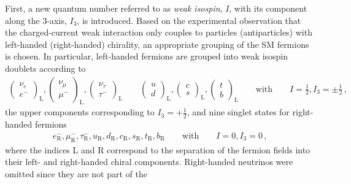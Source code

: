 First, a new quantum number referred to as \emph{weak isospin}, $I$, with its
component along the 3-axis, $I_3$, is introduced. Based on the experimental
observation that the charged-current weak interaction only couples to particles
(antiparticles) with left-handed (right-handed) chirality, an appropriate
grouping of the SM fermions is chosen. In particular, left-handed fermions are
grouped into weak isospin doublets according to
\begin{align*}
  \begin{pmatrix}
    \nu_{e} \\
    e^{-}
  \end{pmatrix}_{\text{L}},
  \begin{pmatrix}
    \nu_{\mu} \\
    \mu^{-}
  \end{pmatrix}_{\text{L}},
  \begin{pmatrix}
    \nu_{\tau} \\
    \tau^{-}
  \end{pmatrix}_{\text{L}}
  \qquad
  \begin{pmatrix}
    u \\
    d
  \end{pmatrix}_{\text{L}},
  \begin{pmatrix}
    c \\
    s
  \end{pmatrix}_{\text{L}},
  \begin{pmatrix}
    t \\
    b
  \end{pmatrix}_{\text{L}}
  \qquad
  \text{with}
  \qquad
  I = \frac{1}{2}, I_3 = \pm \frac{1}{2} \,\text{,}
\end{align*}
the upper components corresponding to $I_3 = +\frac{1}{2}$, and nine singlet
states for right-handed fermions
\begin{align*}
  e^{-}_{\text{R}}, \mu^{-}_{\text{R}}, \tau^{-}_{\text{R}},
  u_{\text{R}}, d_{\text{R}}, c_{\text{R}}, s_{\text{R}}, t_{\text{R}}, b_{\text{R}}
  \qquad
  \text{with}
  \qquad
  I = 0, I_3 = 0 \,\text{,}
\end{align*}
where the indices L and R correspond to the separation of the fermion fields
into their left- and right-handed chiral components. %
Right-handed neutrinos were omitted since they are not part of the
